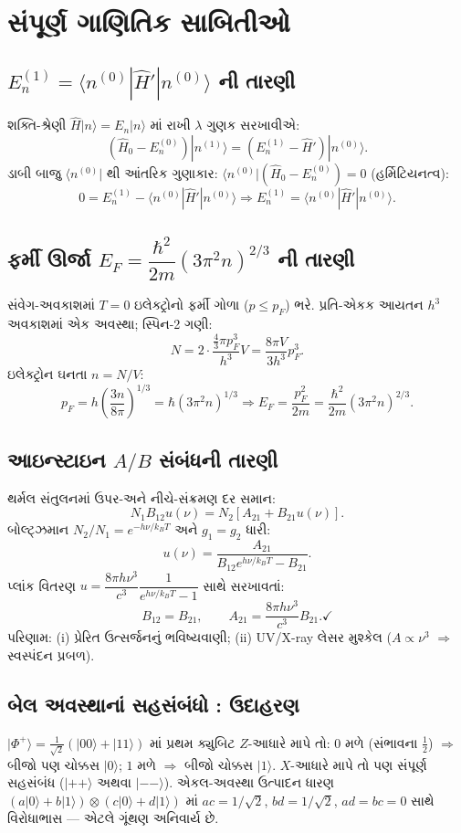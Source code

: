 \section{સંપૂર્ણ ગાણિતિક સાબિતીઓ}

\subsection{$E_n^{(1)}=\langle n^{(0)}|\hat H'|n^{(0)}\rangle$ ની તારણી}
શક્તિ-શ્રેણી $\hat H|n\rangle=E_n|n\rangle$ માં રાખી $\lambda$ ગુણક સરખાવીએ:
\[
(\hat H_0-E_n^{(0)})|n^{(1)}\rangle=(E_n^{(1)}-\hat H')|n^{(0)}\rangle .
\]
ડાબી બાજુ $\langle n^{(0)}|$ થી આંતરિક ગુણાકાર: $\langle n^{(0)}|(\hat H_0-E_n^{(0)})=0$ (હર્મિટિયનત્વ):
\[
0=E_n^{(1)}-\langle n^{(0)}|\hat H'|n^{(0)}\rangle
\Rightarrow\boxed{E_n^{(1)}=\langle n^{(0)}|\hat H'|n^{(0)}\rangle .}
\]

\subsection{ફર્મી ઊર્જા $E_F=\dfrac{\hbar^{2}}{2m}(3\pi^{2}n)^{2/3}$ ની તારણી}
સંવેગ-અવકાશમાં $T=0$ ઇલેક્ટ્રોનો ફર્મી ગોળા ($p\le p_F$) ભરે. પ્રતિ-એકક આયતન $h^{3}$ અવકાશમાં એક અવસ્થા; સ્પિન-2 ગણી:
\[
N=2\cdot\frac{\frac43\pi p_F^{3}}{h^{3}}V=\frac{8\pi V}{3h^{3}}p_F^{3}.
\]
ઇલેક્ટ્રોન ઘનતા $n=N/V$:
\[
p_F=h\left(\frac{3n}{8\pi}\right)^{1/3}=\hbar(3\pi^{2}n)^{1/3}
\Rightarrow
E_F=\frac{p_F^{2}}{2m}=\boxed{\frac{\hbar^{2}}{2m}(3\pi^{2}n)^{2/3}} . 
\]

\subsection{આઇન્સ્ટાઇન $A/B$ સંબંધની તારણી}
થર્મલ સંતુલનમાં ઉપર-અને નીચે-સંક્રમણ દર સમાન:
\[
N_1B_{12}u(\nu)=N_2\left[A_{21}+B_{21}u(\nu)\right].
\]
બોલ્ટ્ઝમાન $N_2/N_1=e^{-h\nu/k_BT}$ અને $g_1=g_2$ ધારી:
\[
u(\nu)=\frac{A_{21}}{B_{12}e^{h\nu/k_BT}-B_{21}} .
\]
પ્લાંક વિતરણ $u=\dfrac{8\pi h\nu^{3}}{c^{3}}\dfrac{1}{e^{h\nu/k_BT}-1}$ સાથે સરખાવતાં:
\[
B_{12}=B_{21},\qquad A_{21}=\frac{8\pi h\nu^{3}}{c^{3}}B_{21} . \checkmark
\]
પરિણામ: (i) પ્રેરિત ઉત્સર્જનનું ભવિષ્યવાણી; (ii) UV/X-ray લેસર મુશ્કેલ ($A\propto\nu^{3}$ $\Rightarrow$ સ્વસ્પંદન પ્રબળ).

\subsection{બેલ અવસ્થાનાં સહસંબંધો : ઉદાહરણ}
$|\Phi^{+}\rangle=\tfrac{1}{\sqrt2}(|00\rangle+|11\rangle)$ માં પ્રથમ ક્યુબિટ $Z$-આધારે માપે તો: $0$ મળે (સંભાવના $\tfrac12$) $\Rightarrow$ બીજો પણ ચોક્કસ $|0\rangle$; $1$ મળે $\Rightarrow$ બીજો ચોક્કસ $|1\rangle$. $X$-આધારે માપે તો પણ સંપૂર્ણ સહસંબંધ ($|++\rangle$ અથવા $|--\rangle$). એકલ-અવસ્થા ઉત્પાદન ધારણ $(a|0\rangle+b|1\rangle)\otimes(c|0\rangle+d|1\rangle)$ માં $ac=1/\sqrt2$, $bd=1/\sqrt2$, $ad=bc=0$ સાથે વિરોધાભાસ — એટલે ગૂંથણ અનિવાર્ય છે.

